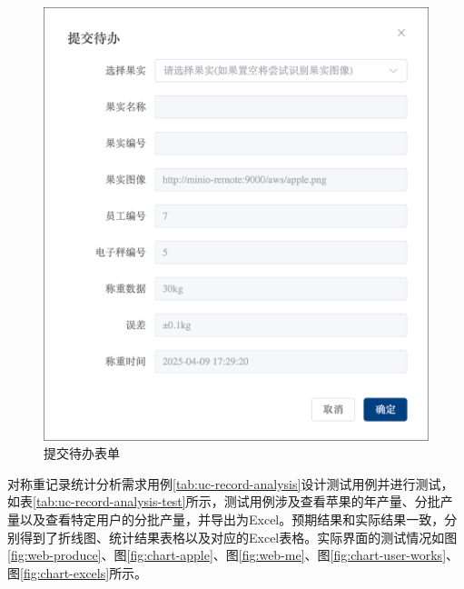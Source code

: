 \begin{figure}
    \centering
    \includegraphics[width=0.8\linewidth]{../result/form-todo-handle.png}
    \caption{提交待办表单}
    \label{fig:form-todo-handle}
\end{figure}

对称重记录统计分析需求用例\ref{tab:uc-record-analysis}设计测试用例并进行测试，如表\ref{tab:uc-record-analysis-test}所示，测试用例涉及查看苹果的年产量、分批产量以及查看特定用户的分批产量，并导出为Excel。预期结果和实际结果一致，分别得到了折线图、统计结果表格以及对应的Excel表格。实际界面的测试情况如图\ref{fig:web-produce}、图\ref{fig:chart-apple}、图\ref{fig:web-me}、图\ref{fig:chart-user-works}、图\ref{fig:chart-excels}所示。

